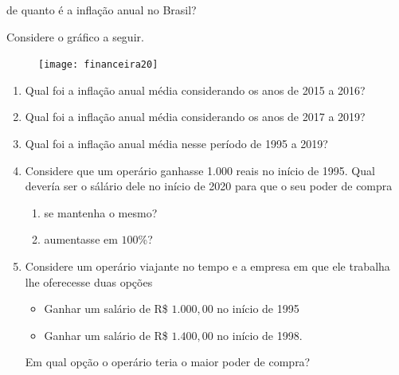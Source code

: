 \begin{task}{de quanto é a inflação anual no Brasil?}
\label{fin-ativ-34}

Considere o gráfico a seguir.

\begin{figure}[H]
\centering

\texttt{[image: financeira20]}
\end{figure}

\begin{enumerate}
  \item Qual foi a inflação anual média considerando os anos de 2015 a 2016?
  \item Qual foi a inflação anual média considerando os anos de 2017 a 2019?
  \item Qual foi a inflação anual média nesse período de 1995 a 2019?
  \item Considere que um operário ganhasse 1.000 reais no início de 1995. Qual devería ser o sálário dele no início de 2020 para que o seu poder de compra
  \begin{enumerate}
    \item se mantenha o mesmo?
    \item aumentasse em $100$\%?
  \end{enumerate}
  \item Considere um operário viajante no tempo e a empresa em que ele trabalha lhe oferecesse duas opções
  \begin{itemize}
    \item Ganhar um salário de R\$ $1.000{,}00$ no início de 1995
    \item Ganhar um salário de R\$ $1.400{,}00$ no início de 1998.
  \end{itemize}
  Em qual opção o operário teria o maior poder de compra?
\end{enumerate}
\end{task}


